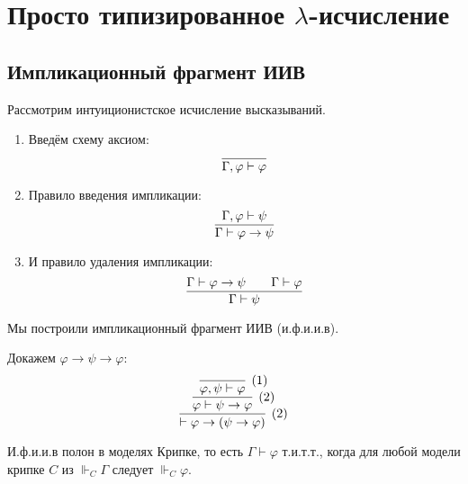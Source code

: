 \section{\texorpdfstring{Просто типизированное $\lambda$-исчисление}{Simply typed lambda calculus}}

\subsection{\texorpdfstring{Импликационный фрагмент ИИВ}{Implication fragment of intuitionistic logic}}

\begin{definition}
    Рассмотрим интуиционистское исчисление высказываний.
    \begin{enumerate}
        \item Введём схему аксиом:
        \[
            \infer{\Gamma, \varphi \vdash \varphi}{}
        \]
        \item Правило введения импликации:
        \[
            \infer{\Gamma \vdash \varphi \to \psi}{\Gamma, \varphi \vdash \psi}
        \]
        \item И правило удаления импликации:
        \[
            \infer{\Gamma \vdash \psi}{\Gamma \vdash \varphi \to \psi && \Gamma \vdash \varphi}
        \]
    \end{enumerate}

    Мы построили импликационный фрагмент ИИВ (и.ф.и.и.в).
\end{definition}

\begin{example} Докажем $\varphi \to \psi \to \varphi$:
\[
    \infer[(2)]
        { \vdash \varphi \to (\psi \to \varphi) }
        { \infer[(2)]
            { \varphi \vdash \psi \to \varphi }
            { \infer[(1)]
                { \varphi, \psi \vdash \varphi}
                {}
            }
        }
\]
\end{example}

\begin{theorem}
    И.ф.и.и.в полон в моделях Крипке, то есть $\Gamma \vdash \varphi$ т.и.т.т.,
    когда для любой модели крипке $C$ из $\Vdash_C \Gamma$ следует $\Vdash_C \varphi$.
\end{theorem}

